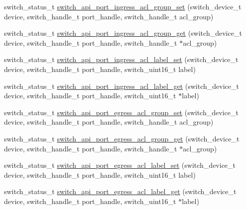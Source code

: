 \begin{DoxyCompactItemize}
\item 
switch\+\_\+status\+\_\+t \hyperlink{group__Port_ga2fe148ddd91df995079fd8952e12035d}{switch\+\_\+api\+\_\+port\+\_\+ingress\+\_\+acl\+\_\+group\+\_\+set} (switch\+\_\+device\+\_\+t device, switch\+\_\+handle\+\_\+t port\+\_\+handle, switch\+\_\+handle\+\_\+t acl\+\_\+group)
\item 
switch\+\_\+status\+\_\+t \hyperlink{group__Port_ga37ec64c2e627dde7ee8cfe6b3c244043}{switch\+\_\+api\+\_\+port\+\_\+ingress\+\_\+acl\+\_\+group\+\_\+get} (switch\+\_\+device\+\_\+t device, switch\+\_\+handle\+\_\+t port\+\_\+handle, switch\+\_\+handle\+\_\+t $\ast$acl\+\_\+group)
\item 
switch\+\_\+status\+\_\+t \hyperlink{group__Port_gaa4eb49e35e7a5d889278fe65c4721e96}{switch\+\_\+api\+\_\+port\+\_\+ingress\+\_\+acl\+\_\+label\+\_\+set} (switch\+\_\+device\+\_\+t device, switch\+\_\+handle\+\_\+t port\+\_\+handle, switch\+\_\+uint16\+\_\+t label)
\item 
switch\+\_\+status\+\_\+t \hyperlink{group__Port_ga8dd3834c0f47483df4c79e32f741b43b}{switch\+\_\+api\+\_\+port\+\_\+ingress\+\_\+acl\+\_\+label\+\_\+get} (switch\+\_\+device\+\_\+t device, switch\+\_\+handle\+\_\+t port\+\_\+handle, switch\+\_\+uint16\+\_\+t $\ast$label)
\item 
switch\+\_\+status\+\_\+t \hyperlink{group__Port_ga47363f3cad57f8f9fb7219c10c6af54e}{switch\+\_\+api\+\_\+port\+\_\+egress\+\_\+acl\+\_\+group\+\_\+set} (switch\+\_\+device\+\_\+t device, switch\+\_\+handle\+\_\+t port\+\_\+handle, switch\+\_\+handle\+\_\+t acl\+\_\+group)
\item 
switch\+\_\+status\+\_\+t \hyperlink{group__Port_gac3d18500fb2baada93efd5439976be3c}{switch\+\_\+api\+\_\+port\+\_\+egress\+\_\+acl\+\_\+group\+\_\+get} (switch\+\_\+device\+\_\+t device, switch\+\_\+handle\+\_\+t port\+\_\+handle, switch\+\_\+handle\+\_\+t $\ast$acl\+\_\+group)
\item 
switch\+\_\+status\+\_\+t \hyperlink{group__Port_ga19430bdee91f4fe0844416ea6b70d0bf}{switch\+\_\+api\+\_\+port\+\_\+egress\+\_\+acl\+\_\+label\+\_\+set} (switch\+\_\+device\+\_\+t device, switch\+\_\+handle\+\_\+t port\+\_\+handle, switch\+\_\+uint16\+\_\+t label)
\item 
switch\+\_\+status\+\_\+t \hyperlink{group__Port_ga13c097fa6231be471830356819fbb309}{switch\+\_\+api\+\_\+port\+\_\+egress\+\_\+acl\+\_\+label\+\_\+get} (switch\+\_\+device\+\_\+t device, switch\+\_\+handle\+\_\+t port\+\_\+handle, switch\+\_\+uint16\+\_\+t $\ast$label)
\item 

\end{DoxyCompactItemize}
